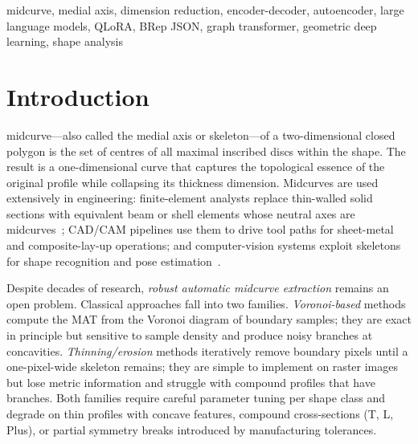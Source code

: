 \documentclass[journal]{IEEEtran}
\begin{document}
\begin{abstract}
\textbf{Phase~III (Geometry-based)} treats the profile as a graph
(polygon corners as nodes, edges as adjacency) and trains a Graph Transformer
to directly produce the midcurve graph—preserving exact floating-point
coordinates and handling branched topologies natively.  This formulation is
analogous to \emph{graph summarisation}: reducing a large polygon graph to a
smaller skeleton graph while retaining structural essence.  Phase~III is
presented at a conceptual level; empirical evaluation on a larger benchmark is
ongoing.

Taken together, the three paradigms illuminate a progression from approximate
(pixel) to exact-but-structural (text token) to exact-and-geometric (graph
node) representations, providing a unified reference framework for future work
on neural geometric dimension reduction.
\end{abstract}

\begin{IEEEkeywords}
midcurve, medial axis, dimension reduction, encoder-decoder, autoencoder,
large language models, QLoRA, BRep JSON, graph transformer, geometric deep
learning, shape analysis
\end{IEEEkeywords}


\section{Introduction}
\label{sec:intro}

 midcurve—also called the medial axis or skeleton—of a
two-dimensional closed polygon is the set of centres of all maximal inscribed
discs within the shape.  The result is a one-dimensional curve that captures the
topological essence of the original profile while collapsing its thickness
dimension.  Midcurves are used extensively in engineering: finite-element
analysts replace thin-walled solid sections with equivalent beam or shell
elements whose neutral axes are midcurves~\cite{lee1999midsurface}; CAD/CAM
pipelines use them to drive tool paths for sheet-metal and composite-lay-up
operations; and computer-vision systems exploit skeletons for shape recognition
and pose estimation~\cite{blum1967transform}.

Despite decades of research, \emph{robust automatic midcurve extraction}
remains an open problem.  Classical approaches fall into two families.
\emph{Voronoi-based} methods~\cite{lavender1992voronoi} compute the MAT from
the Voronoi diagram of boundary samples; they are exact in principle but
sensitive to sample density and produce noisy branches at concavities.
\emph{Thinning/erosion} methods iteratively remove boundary pixels until a
one-pixel-wide skeleton remains; they are simple to implement on raster images
but lose metric information and struggle with compound profiles that have
branches.  Both families require careful parameter tuning per shape class and
degrade on thin profiles with concave features, compound cross-sections (T, L,
Plus), or partial symmetry breaks introduced by manufacturing tolerances.
\end{document}
